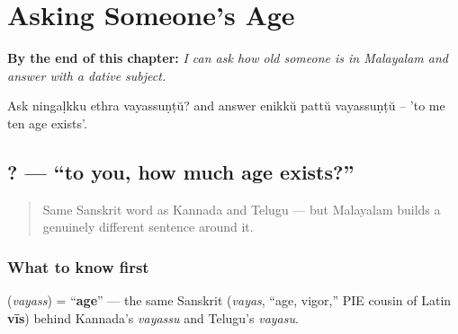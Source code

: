 
\chapter{Asking Someone's Age}
\label{ch:ml-asking-age}

\begin{chapteropening}
\textbf{By the end of this chapter:} \emph{I can ask how old someone is in Malayalam and answer with a dative subject.}

Ask ningaḷkku ethra vayassuṇṭŭ? and answer enikkŭ pattŭ vayassuṇṭŭ -- 'to me ten age exists'.
\end{chapteropening}

\section[\texorpdfstring{\ml{നിങ്ങൾക്ക്} \ml{എത്ര} … (niṅṅaḷkkŭ etra …)}{നിങ്ങൾക്ക് എത്ര … (niṅṅaḷkkŭ etra …)}]{  ? — \textquotedblleft{}to you, how much age exists?\textquotedblright{}}

\label{lesson:ML-C19-vayassu}



\begin{quote}
Same Sanskrit word as Kannada and Telugu — but Malayalam builds a genuinely different sentence around it.
\end{quote}

\subsection*{What to know first}
\textbf{} (\emph{vayass}) = \textquotedblleft{}\textbf{age}\textquotedblright{} — the same Sanskrit \textbf{} (\emph{vayas}, \textquotedblleft{}age, vigor,\textquotedblright{} PIE cousin of Latin \textbf{vīs}) behind Kannada's \emph{vayassu} and Telugu's \emph{vayasu}.

